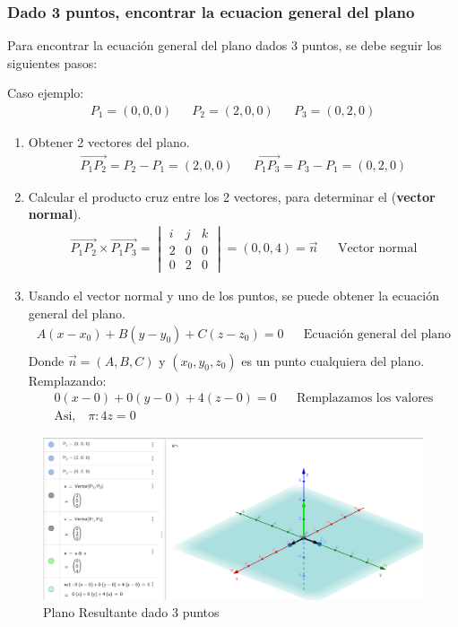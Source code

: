 \documentclass{templateNote}
\begin{document}
\newpage
\subsubsection{Dado 3 puntos, encontrar la ecuacion general del plano}
\indent
Para encontrar la ecuación general del plano dados 3 puntos, se debe seguir los siguientes pasos:

Caso ejemplo:
\begin{align*}
    P_1 = (0, 0, 0) &&
    P_2 = (2, 0, 0) &&
    P_3 = (0, 2, 0)
\end{align*}
\begin{enumerate}
    \item Obtener 2 vectores del plano.
    \begin{align*}
        \overrightarrow{P_1P_2} = P_2 - P_1 = (2, 0, 0) &&
        \overrightarrow{P_1P_3} = P_3 - P_1 = (0, 2, 0)
    \end{align*}
    
    \item Calcular el producto cruz entre los 2 vectores, para determinar el (\textbf{vector normal}).
    \begin{align*}
        \overrightarrow{P_1P_2} \times \overrightarrow{P_1P_3} =  \begin{vmatrix} i & j & k \\ 2 & 0 & 0 \\ 0 & 2 & 0\end{vmatrix} = (0, 0, 4)  = \overrightarrow{n}&& \text{Vector normal}
    \end{align*}
    
    \item Usando el vector normal y uno de los puntos, se puede obtener la ecuación general del plano.
    \begin{align*}
        A(x-x_0) + B(y-y_0) + C(z-z_0) = 0 && \text{Ecuación general del plano} \\
    \end{align*}
    Donde $\overrightarrow{n} = (A, B, C)$ y $(x_0, y_0, z_0)$ es un punto cualquiera del plano.
    Remplazando:
    \begin{align*}
        0(x-0) + 0(y-0) + 4(z-0) = 0 && \text{Remplazamos los valores} \\
        \textrm{Asi,} \quad \pi: 4z = 0
    \end{align*}
\end{enumerate}

\begin{figure}[H]
    \centering
    \includegraphics[width=\linewidth]{img/PlanoResultanteDado3Puntos.png}
    \caption{Plano Resultante dado 3 puntos}
\end{figure}
\newpage
\end{document}
